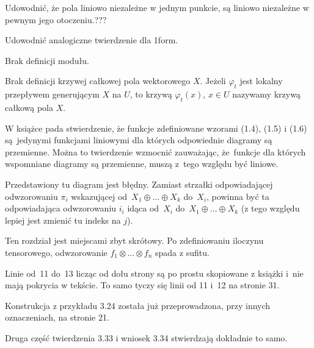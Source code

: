 \documentclass[a4paper,11pt]{article}
\begin{document}




\vspace{\spaceTwo} \vspace{\spaceThree}



\noi {} \Dok \start Udowodnić, że pola liniowo
niezależne w jednym punkcie, są liniowo niezależne w pewnym jego
otoczeniu.???

\start Udowodnić analogiczne twierdzenie dla 1\dywiz form.

\start Brak definicji modułu.

\start Brak definicji krzywej całkowej pola wektorowego $X$. Jeżeli
$\varphi_{ t }$ jest lokalny przepływem generującym $X$ na $U$, to
krzywą $\varphi_{ t }( x )$, $x \in U$ nazywamy krzywą całkową pola
$X$.

\start {} W książce pada stwierdzenie, że funkcje zdefiniowane
wzorami (1.4), (1.5) i (1.6) są~jedynymi funkcjami liniowymi dla
których odpowiednie diagramy są przemienne. Można to twierdzenie
wzmocnić zauważając, że~funkcje dla których wspomniane diagramy są
przemienne, muszą z~tego względu być liniowe.

\start {} Przedstawiony tu diagram jest błędny. Zamiast strzałki
odpowiadającej odwzorowaniu $\pi_{ i }$ wskazującej
od~$X_{ 1 } \oplus \ldots \oplus X_{ k }$ do~$X_{ i }$, powinna być ta
odpowiadająca odwzorowaniu $i_{ i }$ idąca od~$X_{ i }$
do~$X_{ 1 } \oplus \ldots \oplus X_{ k }$ (z tego względu lepiej jest
zmienić tu indeks na $j$).

\start {} Ten rozdział jest miejscami zbyt skrótowy. Po
zdefiniowaniu iloczynu tensorowego, odwzorowanie
$f_{ 1 } \otimes \ldots \otimes f_{ n }$ spada z sufitu.

\start {} Linie od~11 do~13 licząc od dołu strony są po prostu
skopiowane z książki \cite{Gan04} i~nie mają pokrycia w tekście. To
samo tyczy się linii od 11 i~12 na stronie 31.

\start {} Konstrukcja z przykładu 3.24 została już
przeprowadzona, przy innych oznaczeniach, na stronie 21.

\start {} Druga część twierdzenia 3.33 i wniosek 3.34
stwierdzają dokładnie to samo.
\end{document}
